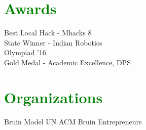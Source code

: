 \documentclass[letterpaper]{deedy-resume-openfont} %
\begin{document}
\begin{minipage}[t]{0.33\textwidth}
\sectionsep %


\section{\textcolor{GREEN}{Awards}}

\textbullet{} Best Local Hack - Mhacks 8 \\
\textbullet{} State Winner - Indian Robotics\\ \hspace{1mm} Olympiad '16\\ 
\textbullet{} Gold Medal - Academic Excellence, DPS\\


\sectionsep %



\section{\textcolor{GREEN}{Organizations}}
Bruin Model UN \textbullet{} ACM \textbullet{} Bruin Entrepreneurs \\



\end{minipage} %
\hfill
%
%
\end{document}
